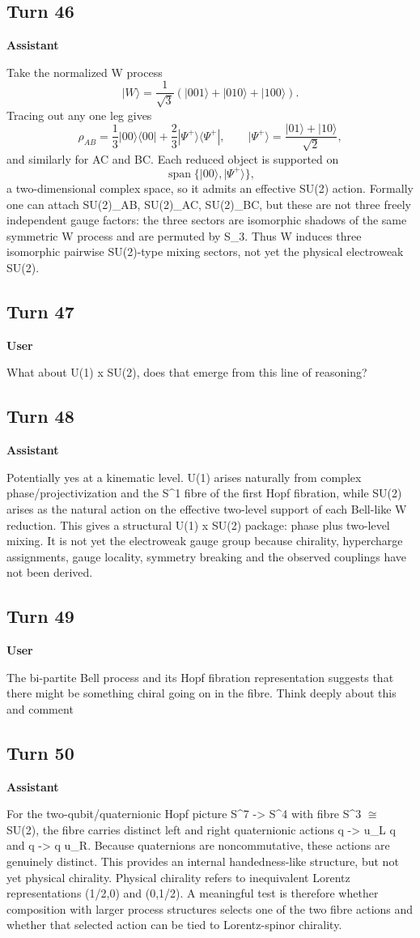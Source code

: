 \documentclass[11pt,a4paper]{article}
\newcommand{\speaker}[1]{\par\medskip\noindent\textbf{\large #1}\par\smallskip}
\begin{document}
\subsection*{Turn 46}
\speaker{Assistant}
Take the normalized W process
\[
|W\rangle=\frac{1}{\sqrt3}(|001\rangle+|010\rangle+|100\rangle).
\]
Tracing out any one leg gives
\[
\rho_{AB}=\frac13|00\rangle\langle00|+\frac23|\Psi^+\rangle\langle\Psi^+|,
\qquad |\Psi^+\rangle=\frac{|01\rangle+|10\rangle}{\sqrt2},
\]
and similarly for AC and BC. Each reduced object is supported on
\[
\operatorname{span}\{|00\rangle,|\Psi^+\rangle\},
\]
a two-dimensional complex space, so it admits an effective SU(2) action. Formally one can attach SU(2)_{AB}, SU(2)_{AC}, SU(2)_{BC}, but these are not three freely independent gauge factors: the three sectors are isomorphic shadows of the same symmetric W process and are permuted by S_3. Thus W induces three isomorphic pairwise SU(2)-type mixing sectors, not yet the physical electroweak SU(2).
\subsection*{Turn 47}
\speaker{User}
What about U(1) x SU(2), does that emerge from this line of reasoning?
\subsection*{Turn 48}
\speaker{Assistant}
Potentially yes at a kinematic level. U(1) arises naturally from complex phase/projectivization and the S\textasciicircum{}1 fibre of the first Hopf fibration, while SU(2) arises as the natural action on the effective two-level support of each Bell-like W reduction. This gives a structural U(1) x SU(2) package: phase plus two-level mixing. It is not yet the electroweak gauge group because chirality, hypercharge assignments, gauge locality, symmetry breaking and the observed couplings have not been derived.
\subsection*{Turn 49}
\speaker{User}
The bi-partite Bell process and its Hopf fibration representation suggests that there might be something chiral going on in the fibre. Think deeply about this and comment
\subsection*{Turn 50}
\speaker{Assistant}
For the two-qubit/quaternionic Hopf picture S\textasciicircum{}7 -> S\textasciicircum{}4 with fibre S\textasciicircum{}3 $\cong$ SU(2), the fibre carries distinct left and right quaternionic actions q -> u\_L q and q -> q u\_R. Because quaternions are noncommutative, these actions are genuinely distinct. This provides an internal handedness-like structure, but not yet physical chirality. Physical chirality refers to inequivalent Lorentz representations (1/2,0) and (0,1/2). A meaningful test is therefore whether composition with larger process structures selects one of the two fibre actions and whether that selected action can be tied to Lorentz-spinor chirality.
\end{document}
